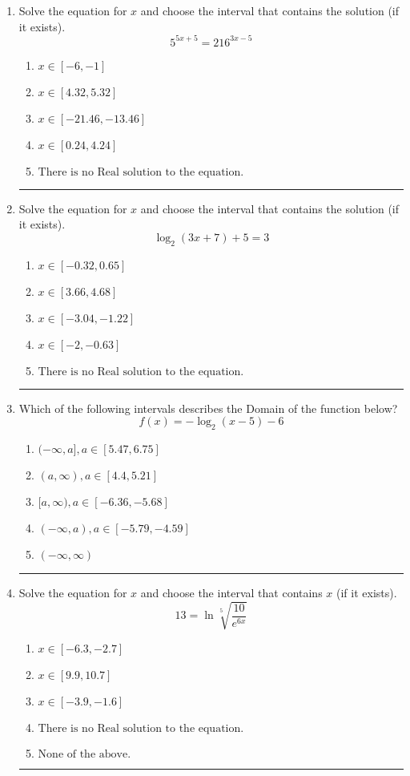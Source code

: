 \documentclass[14pt]{extbook}
\newcommand{\litem}[1]{\item#1\hspace*{-1cm}\rule{\textwidth}{0.4pt}}
\begin{document}
\begin{enumerate}
{\begin{enumerate}[label=\Alph*.]
\end{enumerate} }
\litem{
Solve the equation for $x$ and choose the interval that contains the solution (if it exists).\[ 5^{5x+5} = 216^{3x-5} \]\begin{enumerate}[label=\Alph*.]
\item \( x \in [-6, -1] \)
\item \( x \in [4.32, 5.32] \)
\item \( x \in [-21.46, -13.46] \)
\item \( x \in [0.24, 4.24] \)
\item \( \text{There is no Real solution to the equation.} \)

\end{enumerate} }
\litem{
Solve the equation for $x$ and choose the interval that contains the solution (if it exists).\[ \log_{2}{(3x+7)}+5 = 3 \]\begin{enumerate}[label=\Alph*.]
\item \( x \in [-0.32, 0.65] \)
\item \( x \in [3.66, 4.68] \)
\item \( x \in [-3.04, -1.22] \)
\item \( x \in [-2, -0.63] \)
\item \( \text{There is no Real solution to the equation.} \)

\end{enumerate} }
\litem{
Which of the following intervals describes the Domain of the function below?\[ f(x) = -\log_2{(x-5)}-6 \]\begin{enumerate}[label=\Alph*.]
\item \( (-\infty, a], a \in [5.47, 6.75] \)
\item \( (a, \infty), a \in [4.4, 5.21] \)
\item \( [a, \infty), a \in [-6.36, -5.68] \)
\item \( (-\infty, a), a \in [-5.79, -4.59] \)
\item \( (-\infty, \infty) \)

\end{enumerate} }
\litem{
 Solve the equation for $x$ and choose the interval that contains $x$ (if it exists).\[  13 = \ln{\sqrt[5]{\frac{10}{e^{6x}}}} \]\begin{enumerate}[label=\Alph*.]
\item \( x \in [-6.3, -2.7] \)
\item \( x \in [9.9, 10.7] \)
\item \( x \in [-3.9, -1.6] \)
\item \( \text{There is no Real solution to the equation.} \)
\item \( \text{None of the above.} \)


\end{enumerate}}
\end{enumerate}
\end{document}
